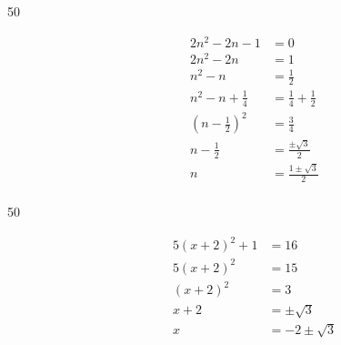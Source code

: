 \documentclass[fleqn,addpoints]{exam}
\begin{document}
\begin{description}
\item[50] 
\begin{align*}
  2n^2 - 2n - 1 &= 0 \\
  2n^2 - 2n &= 1 \\
  n^2 - n &= \frac{1}{2} \\
  n^2 - n + \frac{1}{4} &= \frac{1}{4} + \frac{1}{2} \\
  \left( n-\frac{1}{2} \right)^2 &= \frac{3}{4} \\
  n - \frac{1}{2} &= \frac{\pm \sqrt{3}}{2} \\
  n &= \frac{1 \pm \sqrt{3}}{2} \\
\end{align*}

\item[50] 
\begin{align*}
  5(x+2)^2 + 1 &= 16 \\
  5(x+2)^2 &= 15 \\
  (x+2)^2 &= 3 \\
  x+2 &= \pm \sqrt{3} \\
  x &= -2 \pm \sqrt{3} \\
\end{align*}

\end{description}
\end{document}
